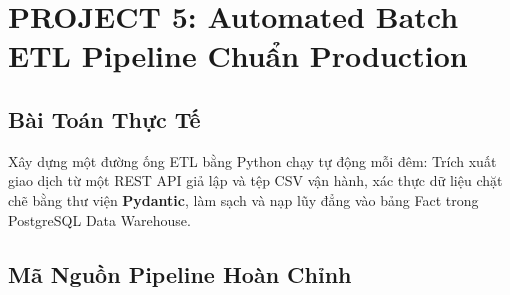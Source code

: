 \section{PROJECT 5: Automated Batch ETL Pipeline Chuẩn Production}

\subsection{Bài Toán Thực Tế}
Xây dựng một đường ống ETL bằng Python chạy tự động mỗi đêm: Trích xuất giao dịch từ một REST API giả lập và tệp CSV vận hành, xác thực dữ liệu chặt chẽ bằng thư viện \textbf{Pydantic}, làm sạch và nạp lũy đẳng vào bảng Fact trong PostgreSQL Data Warehouse.

\subsection{Mã Nguồn Pipeline Hoàn Chỉnh}

